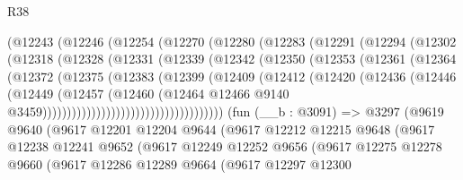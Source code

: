 \begin{lexlean}{R38}
\begin{coremodule}
                (@12243
                  (@12246
                    (@12254
                      (@12270
                        (@12280
                          (@12283
                            (@12291
                              (@12294
                                (@12302
                                  (@12318
                                    (@12328
                                      (@12331
                                        (@12339
                                          (@12342
                                            (@12350
                                              (@12353
                                                (@12361
                                                  (@12364
                                                    (@12372
                                                      (@12375
                                                        (@12383
                                                          (@12399
                                                            (@12409
                                                              (@12412
                                                                (@12420
                                                                  (@12436
                                                                    (@12446
                                                                      (@12449
                                                                        (@12457
                                                                          (@12460
                                                                            (@12464
                                                                              @12466
                                                                              @9140
                                                                              @3459)))))))))))))))))))))))))))))))))))))
    (fun (__b : @3091) =>
    @3297
      (@9619
        @9640
        (@9617
          @12201
          @12204
          @9644
          (@9617
            @12212
            @12215
            @9648
            (@9617
              @12238
              @12241
              @9652
              (@9617
                @12249
                @12252
                @9656
                (@9617
                  @12275
                  @12278
                  @9660
                  (@9617
                    @12286
                    @12289
                    @9664
                    (@9617
                      @12297
                      @12300

\end{coremodule}
\end{lexlean}
